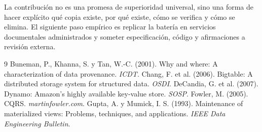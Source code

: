 \documentclass[11pt]{article}
\begin{document}
La contribución no es una promesa de superioridad universal, sino una forma de hacer explícito qué copia existe, por qué existe, cómo se verifica y cómo se elimina. El siguiente paso empírico es replicar la batería en servicios documentales administrados y someter especificación, código y afirmaciones a revisión externa.

\begin{thebibliography}{9}
 Buneman, P., Khanna, S. y Tan, W.-C. (2001). Why and where: A characterization of data provenance. \emph{ICDT}.
 Chang, F. et al. (2006). Bigtable: A distributed storage system for structured data. \emph{OSDI}.
 DeCandia, G. et al. (2007). Dynamo: Amazon's highly available key-value store. \emph{SOSP}.
 Fowler, M. (2005). CQRS. \emph{martinfowler.com}.
 Gupta, A. y Mumick, I. S. (1993). Maintenance of materialized views: Problems, techniques, and applications. \emph{IEEE Data Engineering Bulletin}.
\end{thebibliography}
\end{document}
